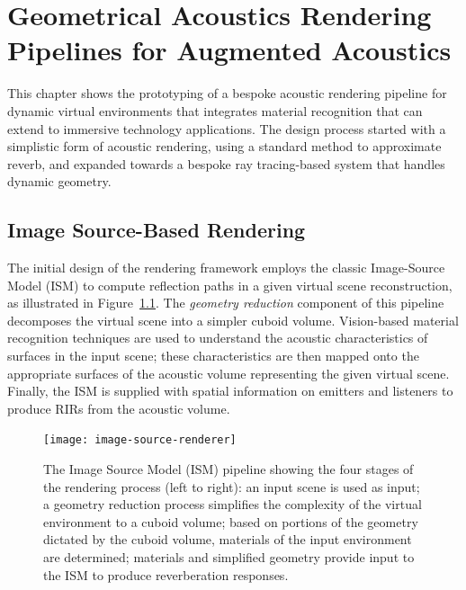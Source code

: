 \chapter{Geometrical Acoustics Rendering Pipelines for Augmented Acoustics}\label{ch:acousticrendering} %

This chapter shows the prototyping of a bespoke acoustic rendering pipeline for dynamic virtual environments that integrates material recognition that can extend to immersive technology applications. The design process started with a simplistic form of acoustic rendering, using a standard method to approximate reverb, and expanded towards a bespoke ray tracing-based system that handles dynamic geometry.

\section{Image Source-Based Rendering}
The initial design of the rendering framework employs the classic Image-Source Model (ISM) \citep{savioja1999creating, allen1979image} to compute reflection paths in a given virtual scene reconstruction, as illustrated in Figure~\ref{fig:image-source-pipeline}. The \emph{geometry reduction} component of this pipeline decomposes the virtual scene into a simpler cuboid volume. Vision-based material recognition techniques are used to understand the acoustic characteristics of surfaces in the input scene; these characteristics are then mapped onto the appropriate surfaces of the acoustic volume representing the given virtual scene. Finally, the ISM is supplied with spatial information on emitters and listeners to produce RIRs from the acoustic volume.\par

\begin{figure}[htb]
    \centering
    \texttt{[image: image-source-renderer]}
    \caption{The Image Source Model (ISM) pipeline showing the four stages of the rendering process (left to right): an input scene is used as input; a geometry reduction process simplifies the complexity of the virtual environment to a cuboid volume; based on portions of the geometry dictated by the cuboid volume, materials of the input environment are determined; materials and simplified geometry provide input to the ISM to produce reverberation responses.}
    \label{fig:image-source-pipeline}
\end{figure}

